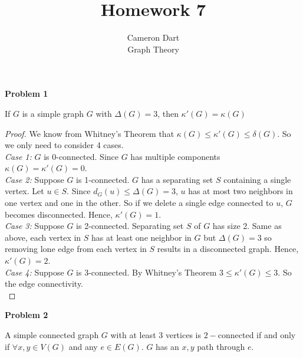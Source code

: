 \documentclass{article}
\newenvironment{claim}[2][Claim]{\begin{trivlist}
		\item[\hskip \labelsep {\bfseries #1}\hskip \labelsep {\bfseries #2}]}{\end{trivlist}}
\begin{document}
\title{Homework 7} 
\author{Cameron Dart\\ Graph Theory} 

\maketitle
\noindent \textbf{Problem 1}
\begin{claim}{}
	If $G$ is a simple graph $G$ with $\Delta(G) = 3$, then $\kappa'(G) = \kappa(G)$
\end{claim}
\begin{proof}We know from Whitney's Theorem that $\kappa(G) \leq \kappa'(G) \leq \delta(G)$. So we only need to consider 4 cases.\\
\textit{Case 1:} $G$ is 0-connected. Since $G$ has multiple components $\kappa(G) = \kappa'(G) = 0$.\\
\textit{Case 2:} Suppose $G$ is 1-connected. $G$ has a separating set $S$ containing a single vertex. Let $u \in S$. Since $d_G(u) \leq \Delta(G) = 3$, $u$ has at most two neighbors in one vertex and one in the other. So if we delete a single edge connected to $u$, $G$ becomes disconnected. Hence, $\kappa'(G) = 1$.\\
\textit{Case 3:} Suppose $G$ is 2-connected. Separating set $S$ of $G$ has size 2. Same as above, each vertex in $S$ has at least one neighbor in $G$ but $\Delta(G) = 3$ so removing lone edge from each vertex in $S$ results in a disconnected graph. Hence, $\kappa'(G) = 2$.   \\
\textit{Case 4:} Suppose $G$ is 3-connected. By Whitney's Theorem $3 \leq \kappa'(G) \leq 3$. So the edge connectivity.  \\
\end{proof}
\noindent \textbf{Problem 2}
\begin{claim}{}
A simple connected graph $G$ with at least $3$ vertices is $2-$connected if and only if $\forall x,y \in V(G)$ and any $e \in E(G)$. $G$ has an $x,y$ path through $e$.
\end{claim}
\end{document}
